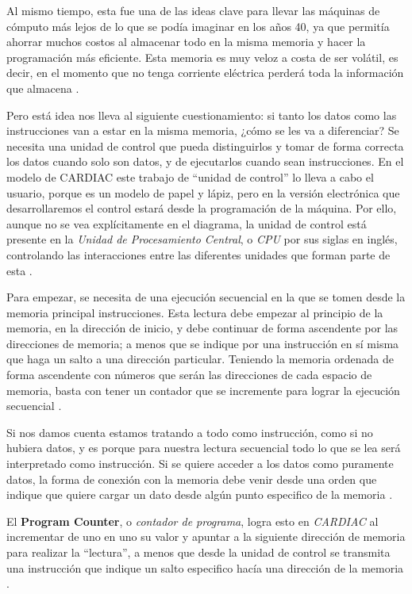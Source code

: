 \documentclass[letterpaper,12pt,oneside]{book}
\begin{document}
		Al mismo tiempo, esta fue una de las ideas clave para llevar las
		máquinas de cómputo más lejos de lo que se podía imaginar en los años 40, ya que permitía ahorrar muchos costos al almacenar todo en la misma memoria 
		y hacer la programación más eficiente. Esta memoria es muy veloz a costa de ser volátil, es decir, en el 
		momento que no tenga corriente eléctrica perderá
		toda la información que almacena \cite{tanenbaum_structured_2013}.
		
		Pero está idea nos lleva al siguiente cuestionamiento: si tanto los datos como las instrucciones van a estar en la misma memoria, ¿cómo se les va a 
		diferenciar? Se necesita una unidad de control que pueda distinguirlos y tomar de forma correcta los datos cuando solo son datos, y
		de ejecutarlos cuando sean instrucciones. En el modelo de CARDIAC este trabajo de ``unidad de control'' lo lleva a cabo el usuario, porque
		es un modelo de papel y lápiz, pero en la versión electrónica que desarrollaremos el control estará desde la programación de la máquina.
		Por ello, aunque
		no se vea explícitamente en el diagrama, la unidad de control está presente en la \textit{Unidad de Procesamiento 
		Central}, o \textit{CPU} por sus siglas en inglés,
		controlando las interacciones entre
		las diferentes unidades que forman parte de esta \cite{von_neumann_papers_1987,fingerman_instruction_1968}.
				
		Para empezar, se necesita de una ejecución secuencial en la que se tomen desde la memoria principal 
		instrucciones. Esta lectura debe empezar al principio de la memoria, en la dirección de inicio, y debe
		continuar de forma ascendente por las direcciones de memoria; a menos que se indique por una instrucción en sí misma
		que haga un salto a una dirección particular.
		Teniendo la memoria ordenada de forma ascendente con números que serán las direcciones de cada espacio de memoria, basta con tener un 
		contador
		que se incremente para lograr la ejecución secuencial \cite{von_neumann_papers_1987}.
		
		Si nos damos cuenta estamos tratando a todo como instrucción, como si 
		no hubiera datos, y es porque para nuestra lectura secuencial todo lo que se lea será interpretado como instrucción. Si se quiere acceder
		a los datos como puramente datos, la forma de conexión con la memoria debe venir desde una orden que indique que quiere cargar un
		dato desde algún punto especifico de la memoria \cite{von_neumann_papers_1987}.
		
		El \textbf{Program Counter}, o \textit{contador de programa}, logra esto en \textit{CARDIAC}  	
		al incrementar de uno
		en uno su valor y apuntar a la siguiente dirección de memoria para realizar la ``lectura'',
		a menos que desde la unidad de control se transmita una instrucción que indique un salto 
		especifico hacía una dirección de la memoria \cite{fingerman_instruction_1968}.		
		
\end{document}
